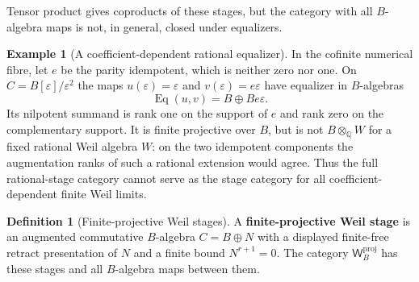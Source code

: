 \documentclass[11pt,a4paper]{article}
\numberwithin{algorithm}{section}
\numberwithin{equation}{section}
\theoremstyle{definition}
\newtheorem{definition}[definition]{Definition}
\newtheorem{example}[example]{Example}
\theoremstyle{remark}
\theoremstyle{plain}
\newcommand{\QQ}{\mathbb Q}
\newcommand{\eps}{\varepsilon}
\newcommand{\Weil}{\mathsf W}
\theoremstyle{definition}
\theoremstyle{plain}
\begin{document}
  Tensor product gives coproducts of these
stages, but the category with all $B$-algebra maps is not, in general,
closed under equalizers.

\begin{example}[A coefficient-dependent rational equalizer]
\label{ex:weilstage-rank}
In the cofinite numerical fibre, let $e$ be the parity idempotent,
which is neither zero nor one.  On $C=B[\eps]/\eps^2$ the maps
$u(\eps)=\eps$ and $v(\eps)=e\eps$ have equalizer in $B$-algebras
\[
 \operatorname{Eq}(u,v)=B\oplus Be\eps.
\]
Its nilpotent summand is rank one on the support of $e$ and rank zero
on the complementary support.  It is finite projective over $B$, but
is not $B\otimes_\QQ W$ for a fixed rational Weil algebra $W$:
on the two idempotent components the augmentation ranks of such a
rational extension would agree.  Thus the full rational-stage category
cannot serve as the stage category for all coefficient-dependent
finite Weil limits.
\end{example}

\begin{definition}[Finite-projective Weil stages]\label{def:projective-weil-stages}
A \textbf{finite-projective Weil stage} is an augmented commutative
$B$-algebra $C=B\oplus N$ with a displayed finite-free retract
presentation of $N$ and a finite bound $N^{r+1}=0$.
The category $\Weil_B^{\mathrm{proj}}$ has these stages and all
$B$-algebra maps between them.
\end{definition}
\end{document}
